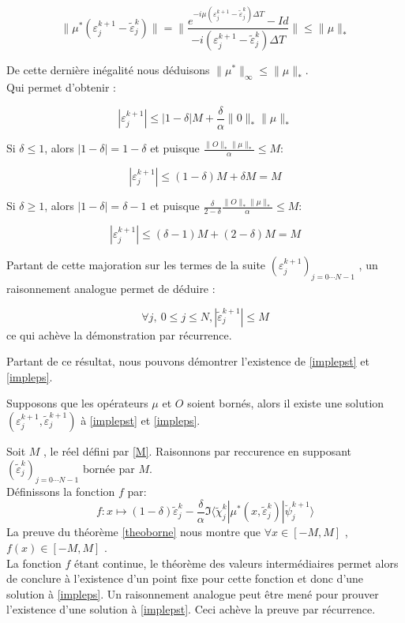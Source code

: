\begin{ proof }
	$$ \lVert \mu^* ( \varepsilon_j^{k+1} - \tilde{\varepsilon}_j^k) \rVert = \lVert \frac{e^{-i \mu( \varepsilon_j^{k+1} - \tilde{\varepsilon}_j^k)\Delta T}-Id}{-i ( \varepsilon_j^{k+1} - \tilde{\varepsilon}_j^k)\Delta T} \rVert \leq \lVert \mu \rVert_*  $$
	
	De cette dernière inégalité nous déduisons $ \lVert \mu^* \rVert_{\infty} \leq  \lVert \mu \rVert_*  $.\\ Qui permet d'obtenir :
	
	$$
	|\varepsilon_j^{k+1}| \leq |1-\delta|M + \frac{\delta}{\alpha} \lVert 0 \rVert_* \lVert \mu \rVert_{*}
	$$
	
	Si $\delta \leq 1$, alors $|1-\delta| = 1-\delta$ et puisque $\frac{\lVert O \rVert_* \lVert \mu \rVert_* }{\alpha} \leq M$:
	
	$$ |\varepsilon_j^{k+1} | \leq (1-\delta)M + \delta M = M $$
	
	Si $\delta \geq 1$, alors $|1-\delta| = \delta - 1$ et puisque $\frac{\delta}{2-\delta} \frac{\lVert O \rVert_* \lVert \mu \rVert_* }{\alpha} \leq M$:
	
	$$ |\varepsilon_j^{k+1} | \leq (\delta-1)M + (2-\delta) M = M $$
	
	Partant de cette majoration sur les termes de la suite $ (\varepsilon_j^{k+1})_{j=0\cdots N-1} $ , un raisonnement analogue permet de déduire :
	
	$$ \forall j,\ 0 \leq j \leq N, |\tilde{\varepsilon}_j^{k+1} | \leq M $$
	ce qui achève la démonstration par récurrence.
\end{ proof }

Partant de ce résultat, nous pouvons démontrer l’existence de \eqref{implepst} et \eqref{impleps}.

\begin{theorem}
	Supposons que les opérateurs $\mu$ et $O$ soient bornés, alors il existe une solution $ ( \varepsilon_j^{k+1}, \tilde{\varepsilon}_j^{k+1} ) $ à \eqref{implepst} et \eqref{impleps}.
\end{theorem}

\begin{ proof }
	
	Soit $M$ , le réel défini par \eqref{M}. Raisonnons par reccurence en supposant  
	$(\tilde{\varepsilon}_j^k)_{j=0\cdots N-1}$ bornée par $M$.\\
	Définissons la fonction $f$ par:
	\begin{equation} \label{f}
	f: x \mapsto (1-\delta)\tilde{\varepsilon}^k_j - \frac{\delta}{\alpha}\Im \langle  \tilde{\chi}^k_{j}|\mu^*(x,\tilde{\varepsilon}^k_j)|\breve{\psi}^{k+1}_{j} \rangle
	\end{equation}
	La preuve du théorème \ref{theoborne} nous montre que $\forall x \in [-M, M ]$ , $f(x) \in [-M, M ]$ .\\
	La fonction $f$ étant continue, le théorème des valeurs intermédiaires permet alors de conclure à l'existence d’un point fixe pour cette fonction et donc d’une solution à \eqref{impleps}. Un raisonnement analogue peut être mené pour prouver l'existence d’une solution à \eqref{implepst}. Ceci achève la preuve par récurrence.
	
\end{ proof }

